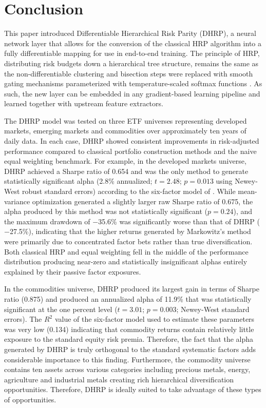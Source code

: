 \section{Conclusion}

This paper introduced Differentiable Hierarchical Risk Parity (DHRP), a neural network layer that allows for the conversion of the classical HRP algorithm \citep{LopezdePrado2016} into a fully differentiable mapping for use in end-to-end training. The principle of HRP, distributing risk budgets down a hierarchical tree structure, remains the same as the non-differentiable clustering and bisection steps were replaced with smooth gating mechanisms parameterized with temperature-scaled softmax functions \citep{Vaswani2017}. As such, the new layer can be embedded in any gradient-based learning pipeline and learned together with upstream feature extractors.

The DHRP model was tested on three ETF universes representing developed markets, emerging markets and commodities over approximately ten years of daily data. In each case, DHRP showed consistent improvements in risk-adjusted performance compared to classical portfolio construction methods and the naive equal weighting benchmark. For example, in the developed markets universe, DHRP achieved a Sharpe ratio of 0.654 and was the only method to generate statistically significant alpha (2.8\% annualized; $t=2.48$; $p=0.013$ using Newey-West robust standard errors) according to the six-factor model of \citet{FamaFrench2015, FamaFrench2018, Carhart1997}. While \citet{Markowitz1952} mean-variance optimization generated a slightly larger raw Sharpe ratio of 0.675, the alpha produced by this method was not statistically significant ($p=0.24$), and the maximum drawdown of $-$35.6\% was significantly worse than that of DHRP ($-$27.5\%), indicating that the higher returns generated by Markowitz's method were primarily due to concentrated factor bets rather than true diversification. Both classical HRP and equal weighting fell in the middle of the performance distribution producing near-zero and statistically insignificant alphas entirely explained by their passive factor exposures.

In the commodities universe, DHRP produced its largest gain in terms of Sharpe ratio (0.875) and produced an annualized alpha of 11.9\% that was statistically significant at the one percent level ($t = 3.01$; $p = 0.003$; Newey-West standard errors). The $R^2$ value of the six-factor model used to estimate these parameters was very low (0.134) indicating that commodity returns contain relatively little exposure to the standard equity risk premia. Therefore, the fact that the alpha generated by DHRP is truly orthogonal to the standard systematic factors adds considerable importance to this finding. Furthermore, the commodity universe contains ten assets across various categories including precious metals, energy, agriculture and industrial metals creating rich hierarchical diversification opportunities. Therefore, DHRP is ideally suited to take advantage of these types of opportunities.

